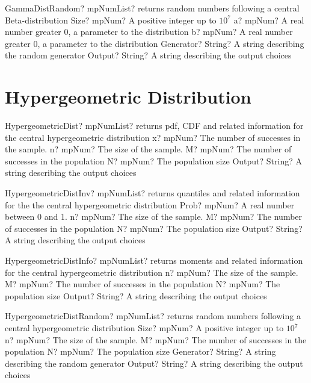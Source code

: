 \documentclass[12pt,a4paper,openany]{book}
\begin{document}
\begin{mpFunctionsExtract}
\mpFunctionFive
{GammaDistRandom? mpNumList? returns random numbers following a central Beta-distribution}
{Size? mpNum? A positive integer up to $10^7$}
{a? mpNum? A real number greater 0, a parameter to the distribution}
{b? mpNum? A real number greater 0, a parameter to the distribution}
{Generator? String? A string describing the random generator}
{Output? String? A string describing the output choices}
\end{mpFunctionsExtract}

\section{Hypergeometric Distribution}

\begin{mpFunctionsExtract}
\mpFunctionFive
{HypergeometricDist? mpNumList? returns pdf, CDF and related information for the central hypergeometric distribution}
{x? mpNum? The number of successes in the sample.}
{n? mpNum? The size of the sample.}
{M? mpNum? The number of successes in the population}
{N? mpNum? The population size}
{Output? String? A string describing the output choices}
\end{mpFunctionsExtract}

\begin{mpFunctionsExtract}
\mpFunctionFive
{HypergeometricDistInv? mpNumList? returns quantiles and related information for the the central hypergeometric distribution}
{Prob? mpNum? A real number between 0 and 1.}
{n? mpNum? The size of the sample.}
{M? mpNum? The number of successes in the population}
{N? mpNum? The population size}
{Output? String? A string describing the output choices}
\end{mpFunctionsExtract}

\begin{mpFunctionsExtract}
\mpFunctionFour
{HypergeometricDistInfo? mpNumList? returns moments and related information for the central hypergeometric distribution}
{n? mpNum? The size of the sample.}
{M? mpNum? The number of successes in the population}
{N? mpNum? The population size}
{Output? String? A string describing the output choices}
\end{mpFunctionsExtract}

\begin{mpFunctionsExtract}
\mpFunctionSix
{HypergeometricDistRandom? mpNumList? returns random numbers following a central hypergeometric distribution}
{Size? mpNum? A positive integer up to $10^7$}
{n? mpNum? The size of the sample.}
{M? mpNum? The number of successes in the population}
{N? mpNum? The population size}
{Generator? String? A string describing the random generator}
{Output? String? A string describing the output choices}
\end{mpFunctionsExtract}
\end{document}
